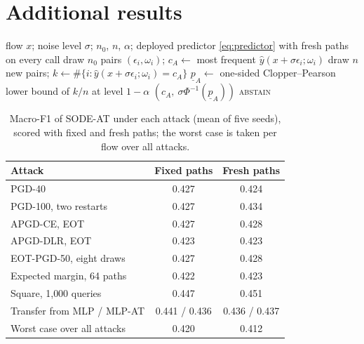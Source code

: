 \section{Additional results}\label{app:tables}
\begin{algorithm}[t]
\caption{\textsc{CertifySmoothed}$(x)$ for the stochastic detector}
\label{alg:certify}
\begin{algorithmic}[1]
\REQUIRE flow $x$; noise level $\sigma$; $n_0$, $n$, $\alpha$; deployed predictor \eqref{eq:predictor} with fresh paths on every call
\STATE draw $n_0$ pairs $(\epsilon_i,\omega_i)$; $c_A\leftarrow$ most frequent $\hat y(x+\sigma\epsilon_i;\omega_i)$ \hfill{}
\STATE draw $n$ new pairs; $k\leftarrow\#\{i:\hat y(x+\sigma\epsilon_i;\omega_i)=c_A\}$ \hfill{}
\STATE $\underline p_A\leftarrow$ one-sided Clopper--Pearson lower bound of $k/n$ at level $1-\alpha$
 \RETURN $(c_A,\ \sigma\Phi^{-1}(\underline p_A))$ \ELSE \RETURN \textsc{abstain} \ENDIF
\end{algorithmic}
\end{algorithm}

\begin{table}[t]
\caption{Macro-F1 of SODE-AT under each attack (mean of five seeds), scored with
fixed and fresh paths; the worst case is taken per flow over all attacks.}
\label{tab:attacks}
\centering\small
\begin{tabular}{lcc}
\toprule
Attack & Fixed paths & Fresh paths\\
\midrule
PGD-40 & 0.427 & 0.424\\
PGD-100, two restarts & 0.427 & 0.434\\
APGD-CE, EOT & 0.427 & 0.428\\
APGD-DLR, EOT & 0.423 & 0.423\\
EOT-PGD-50, eight draws & 0.427 & 0.428\\
Expected margin, 64 paths & 0.422 & 0.423\\
Square, 1{,}000 queries & 0.447 & 0.451\\
Transfer from MLP / MLP-AT & 0.441 / 0.436 & 0.436 / 0.437\\
\midrule
Worst case over all attacks & 0.420 & 0.412\\
\bottomrule
\end{tabular}
\end{table}

